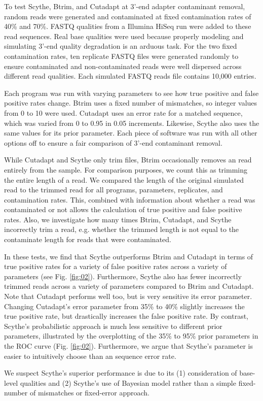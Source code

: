 \documentclass{bioinfo}
\begin{document}
\begin{methods}
To test Scythe, Btrim, and Cutadapt at 3'-end adapter contaminant
removal, random reads were generated and contaminated at fixed
contamination rates of 40\% and 70\%. FASTQ qualities from a Illumina
HiSeq run were added to these read sequences. Real base qualities were
used because properly modeling and simulating 3'-end quality
degradation is an arduous task. For the two fixed contamination rates,
ten replicate FASTQ files were generated randomly to ensure
contaminated and non-contaminated reads were well dispersed across
different read qualities. Each simulated FASTQ reads file contains
10,000 entries.

Each program was run with varying parameters to see how true positive
and false positive rates change. Btrim uses a fixed number of
mismatches, so integer values from 0 to 10 were used. Cutadapt uses an
error rate for a matched sequence, which was varied from 0 to 0.95 in
0.05 increments. Likewise, Scythe also uses the same values for its
prior parameter. Each piece of software was run with all other options
off to ensure a fair comparison of 3'-end contaminant removal.

While Cutadapt and Scythe only trim files, Btrim occasionally removes
an read entirely from the sample. For comparison purposes, we count
this as trimming the entire length of a read. We compared the length
of the original simulated read to the trimmed read for all programs,
parameters, replicates, and contamination rates. This, combined with
information about whether a read was contaminated or not allows the
calculation of true positive and false positive rates. Also, we
investigate how many times Btrim, Cutadapt, and Scythe incorrectly
trim a read, e.g. whether the trimmed length is not equal to the
contaminate length for reads that were contaminated.

In these tests, we find that Scythe outperforms Btrim and Cutadapt in
terms of true positive rates for a variety of false positive rates
across a variety of parameters (see Fig. \ref{fig:02}). Furthermore,
Scythe also has fewer incorrectly trimmed reads across a variety of
parameters compared to Btrim and Cutadapt. Note that Cutadapt performs
well too, but is very sensitive its error parameter. Changing
Cutadapt's error parameter from 35\% to 40\% slightly increases the
true positive rate, but drastically increases the false positive
rate. By contrast, Scythe's probabilistic approach is much less
sensitive to different prior parameters, illustrated by the
overplotting of the 35\% to 95\% prior parameters in the ROC curve
(Fig. \ref{fig:02}). Furthermore, we argue that Scythe's parameter is
easier to intuitively choose than an sequence error rate.

We suspect Scythe's superior performance is due to its (1)
consideration of base-level qualities and (2) Scythe's use of Bayesian
model rather than a simple fixed-number of mismatches or fixed-error
approach.

\end{methods}
\end{document}
